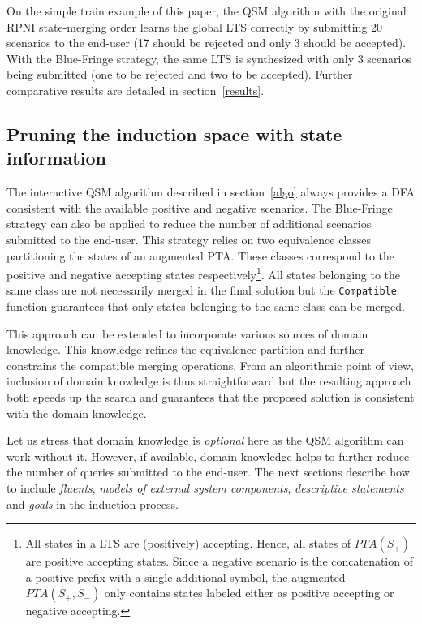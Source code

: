 On the simple train example of this paper, the QSM algorithm with the original RPNI state-merging order learns the global LTS correctly by submitting 20 scenarios to the end-user (17 should be rejected and only 3 should be accepted). With the Blue-Fringe strategy, the same LTS is synthesized with only 3 scenarios being submitted (one to be rejected and two to be accepted). Further comparative results are detailed in section~\ref{results}.

\subsection{Pruning the induction space with state information}

The interactive QSM algorithm described in section~\ref{algo} always provides a DFA consistent with the available positive and negative scenarios. The Blue-Fringe strategy can also be applied to reduce the number of additional scenarios submitted to the end-user. This strategy relies on two equivalence classes partitioning the states of an augmented PTA. These classes correspond to the positive and negative accepting states respectively\footnote{All states in a LTS are (positively) accepting. Hence, all states of $PTA(S_+)$ are positive accepting states. Since a negative scenario is the concatenation of a positive prefix with a single additional symbol, the augmented $PTA(S_+, S_-)$ only contains states labeled either as positive accepting or negative accepting.}. All states belonging to the same class are not necessarily merged in the final solution but the \texttt{Compatible} function guarantees that only states belonging to the same class can be merged.

This approach can be extended to incorporate various sources of domain knowledge. This knowledge refines the equivalence partition and further constrains the compatible merging operations. From an algorithmic point of view, inclusion of domain knowledge is thus straightforward but the resulting approach both speeds up the search and guarantees that the proposed solution is consistent with the domain knowledge.

Let us stress that domain knowledge is \textsl{optional} here as the QSM algorithm can work without it. However, if available, domain knowledge helps to further reduce the number of queries submitted to the end-user. The next sections describe how to include \textsl{fluents}, \textsl{models of external system components}, \textsl{descriptive statements} and \textsl{goals} in the induction process.

